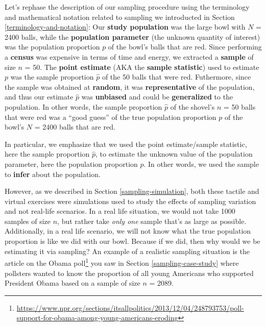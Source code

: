 \documentclass[12pt, krantz2,]{krantz}
\renewcommand{\href}[2]{#2\footnote{\url{#1}}}
\begin{document}
Let's rephase the description of our sampling procedure using the terminology and mathematical notation related to sampling we introducted in Section \ref{terminology-and-notation}: Our \textbf{study population} was the large bowl with \(N\) = 2400 balls, while the \textbf{population parameter} (the unknown quantity of interest) was the population proportion \(p\) of the bowl's balls that are red. Since performing a \textbf{census} was expensive in terms of time and energy, we extracted a \textbf{sample} of size \(n\) = 50. The \textbf{point estimate} (AKA the \textbf{sample statistic}) used to estimate \(p\) was the sample proportion \(\widehat{p}\) of the 50 balls that were red. Futhermore, since the sample was obtained at \textbf{random}, it was \textbf{representative} of the population, and thus our estimate \(\widehat{p}\) was \textbf{unbiased} and could be \textbf{generalized} to the population. In other words, the sample proportion \(\widehat{p}\) of the shovel's \(n\) = 50 balls that were red was a ``good guess'' of the true population proportion \(p\) of the bowl's \(N\) = 2400 balls that are red.

In particular, we emphasize that we used the point estimate/sample statistic, here the sample proportion \(\widehat{p}\), to estimate the unknown value of the population parameter, here the population proportion \(p\). In other words, we used the sample to \textbf{infer} about the population.

However, as we described in Section \ref{sampling-simulation}, both these tactile and virtual exercises were simulations used to study the effects of sampling variation and not real-life scenarios. In a real life situation, we would not take 1000 samples of size \(n\), but rather take \emph{only one} sample that's as large as possible. Additionally, in a real life scenario, we will not know what the true population proportion is like we did with our bowl. Because if we did, then why would we be estimating it via sampling? An example of a realistic sampling situation is the article on the \href{https://www.npr.org/sections/itsallpolitics/2013/12/04/248793753/poll-support-for-obama-among-young-americans-eroding}{Obama poll} you saw in Section \ref{sampling-case-study} where pollsters wanted to know the proportion of all young Americans who supported President Obama based on a sample of size \(n\) = 2089.
\end{document}
